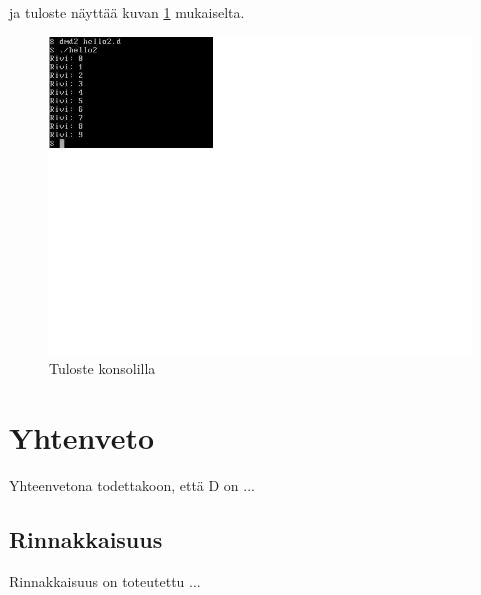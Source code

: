 \documentclass[11pt,oneside,a4paper]{article}
\begin{document}
ja tuloste näyttää kuvan \ref{konsoli1} mukaiselta.
\begin{figure}[tbh]
\begin{center}
\includegraphics[width=1.0\textwidth]{konsoli1.jpg}
\caption{Tuloste konsolilla}
\label{konsoli1}
\end{center}
\end{figure}

\section{Yhtenveto}
Yhteenvetona todettakoon, että D on ...
\subsection{Rinnakkaisuus}
Rinnakkaisuus on toteutettu ...
\end{document}
